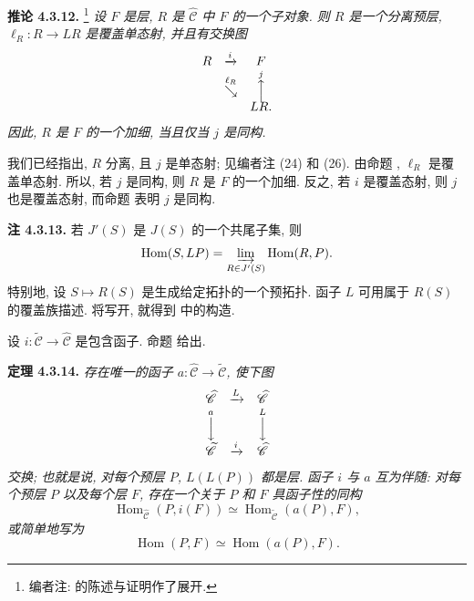 \medskip
\noindent{}\textbf{推论 4.3.12.}
\footnote{编者注: 的陈述与证明作了展开.}
\textit{设 \(F\) 是层, \(R\) 是 \(\widehat{\mathscr C}\) 中 \(F\) 的一个子对象.
则 \(R\) 是一个分离预层, \(\ell_R:R\to LR\) 是覆盖单态射,
并且有交换图}
\[
\begin{array}{ccc}
 R&\xrightarrow{i}&F\\
 &\overset{\ell_R}{\searrow}
 &\overset{j}{\Big\uparrow}\\[-0.5ex]
 &&LR.
\end{array}
\]
\textit{因此, \(R\) 是 \(F\) 的一个加细, 当且仅当 \(j\) 是同构.}

我们已经指出, \(R\) 分离, 且 \(j\) 是单态射;
见编者注 (24) 和 (26).
由命题 ,
\(\ell_R\) 是覆盖单态射.
所以, 若 \(j\) 是同构, 则 \(R\) 是 \(F\) 的一个加细.
反之, 若 \(i\) 是覆盖态射, 则 \(j\) 也是覆盖态射,
而命题  表明 \(j\) 是同构.

\medskip
\noindent{}\textbf{注 4.3.13.}
若 \(J'(S)\) 是 \(J(S)\) 的一个共尾子集, 则
\[
 \operatorname{Hom}(S,LP)=
 \varinjlim_{R\in J'(S)}\operatorname{Hom}(R,P).
\]
特别地, 设 \(S\mapsto R(S)\) 是生成给定拓扑的一个预拓扑.
函子 \(L\) 可用属于 \(R(S)\) 的覆盖族描述.
将写开,
就得到  中的构造.

设 \(i:\widetilde{\mathscr C}\to\widehat{\mathscr C}\) 是包含函子.
命题 
给出.

\medskip
\noindent{}\textbf{定理 4.3.14.}
\textit{存在唯一的函子 \(a:\widehat{\mathscr C}\to\widetilde{\mathscr C}\),
使下图}
\[
\begin{array}{ccc}
 \widehat{\mathscr C}&\xrightarrow{L}&\widehat{\mathscr C}\\
 \overset{a}{\Big\downarrow}&&
 \overset{L}{\Big\downarrow}\\
 \widetilde{\mathscr C}&\xrightarrow{i}&\widehat{\mathscr C}
\end{array}
\]
\textit{交换; 也就是说, 对每个预层 \(P\), \(L(L(P))\) 都是层.
函子 \(i\) 与 \(a\) 互为伴随:
对每个预层 \(P\) 以及每个层 \(F\), 存在一个关于 \(P\) 和 \(F\) 具函子性的同构}
\[
 \operatorname{Hom}_{\widehat{\mathscr C}}(P,i(F))
 \simeq
 \operatorname{Hom}_{\widetilde{\mathscr C}}(a(P),F),
\]
\textit{或简单地写为}
\[
 \operatorname{Hom}(P,F)\simeq\operatorname{Hom}(a(P),F).
\]

